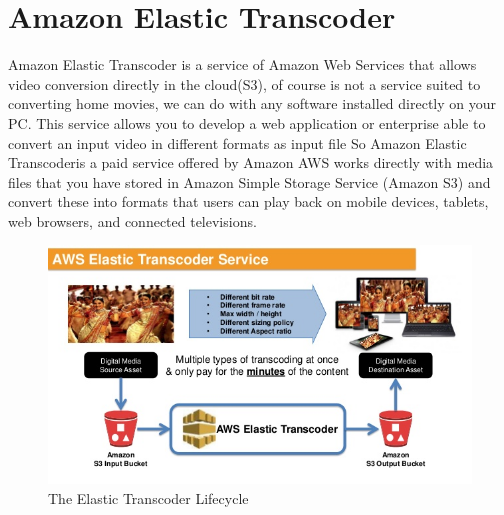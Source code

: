 \section{Amazon Elastic Transcoder}
\label{sec:Amazon Elastic Transcoder}

Amazon Elastic Transcoder is a service of Amazon Web Services that allows video conversion directly in the cloud(S3), of course is not a service suited to converting home movies, we can do with any software installed directly on your PC. 
This service allows you to develop a web application or enterprise able to convert an input video in different formats as input file
So Amazon Elastic Transcoderis a paid service offered by Amazon AWS works directly with media files that you have stored in Amazon Simple Storage Service (Amazon S3) and convert these into formats that users can play back on mobile devices, tablets, web browsers, and connected televisions.

\begin{figure}[htb] %
 \centering
 \includegraphics[width=1.0\linewidth]{images/chapter2/aws_transcoder.jpg}\hfill
 \caption[The Elastic Transcoder Lifecycle]{The Elastic Transcoder Lifecycle}
 \label{fig:fourV}
\end{figure}

